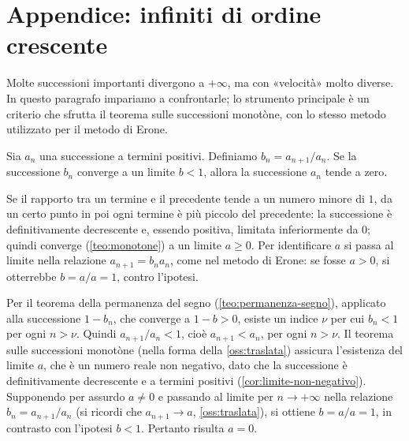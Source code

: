 \section{Appendice: infiniti di ordine crescente}
\label{sec:infiniti}

Molte successioni importanti divergono a $+\infty$, ma con «velocità» molto diverse. In
questo paragrafo impariamo a confrontarle; lo strumento principale è un criterio che
sfrutta il teorema sulle successioni monotòne, con lo stesso metodo utilizzato per il
metodo di Erone.

\begin{teorema}\label{teo:criterio-rapporto}
Sia $a_{n}$ una successione a termini positivi. Definiamo $b_{n}=a_{n+1}/a_{n}$. Se la
successione $b_{n}$ converge a un limite $b<1$, allora la successione $a_{n}$ tende a
zero.
\end{teorema}

\begin{schema}
\end{schema}

\begin{strategia}
Se il rapporto tra un termine e il precedente tende a un numero minore di $1$, da un
certo punto in poi ogni termine è più piccolo del precedente: la successione è
definitivamente decrescente e, essendo positiva, limitata inferiormente da $0$; quindi
converge (\cref{teo:monotone}) a un limite $a\ge0$. Per identificare $a$ si passa al
limite nella relazione $a_{n+1}=b_{n}a_{n}$, come nel metodo di Erone: se fosse $a>0$, si
otterrebbe $b=a/a=1$, contro l'ipotesi.
\end{strategia}

\begin{dimostrazione}
Per il teorema della permanenza del segno (\cref{teo:permanenza-segno}), applicato alla
successione $1-b_{n}$, che converge a $1-b>0$, esiste un indice $\nu$ per cui $b_{n}<1$
per ogni $n>\nu$. Quindi $a_{n+1}/a_{n}<1$, cioè $a_{n+1}<a_{n}$, per ogni $n>\nu$. Il
teorema sulle successioni monotòne (nella forma della \cref{oss:traslata}) assicura
l'esistenza del limite $a$, che è un numero reale non negativo, dato che la successione
è definitivamente decrescente e a termini positivi (\cref{cor:limite-non-negativo}).
Supponendo per assurdo $a\neq0$ e passando al limite per $n\to+\infty$ nella relazione
$b_{n}=a_{n+1}/a_{n}$ (si ricordi che $a_{n+1}\to a$, \cref{oss:traslata}), si ottiene
$b=a/a=1$, in contrasto con l'ipotesi $b<1$. Pertanto risulta $a=0$.
\end{dimostrazione}

